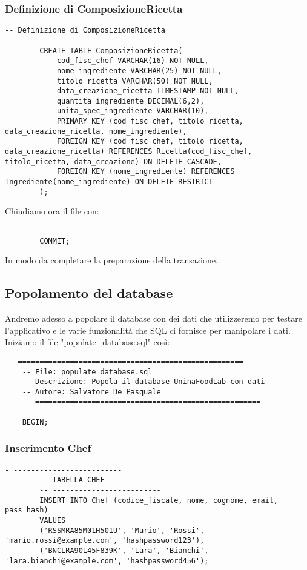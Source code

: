 \documentclass[a4paper, 12pt]{article}
\begin{document}
        \subsubsection{Definizione di ComposizioneRicetta}
        \begin{lstlisting}[style=sqlstyle]
        -- Definizione di ComposizioneRicetta
        
        CREATE TABLE ComposizioneRicetta(
            cod_fisc_chef VARCHAR(16) NOT NULL,
            nome_ingrediente VARCHAR(25) NOT NULL,
            titolo_ricetta VARCHAR(50) NOT NULL,
            data_creazione_ricetta TIMESTAMP NOT NULL,
            quantita_ingrediente DECIMAL(6,2),
            unita_spec_ingrediente VARCHAR(10),
            PRIMARY KEY (cod_fisc_chef, titolo_ricetta, data_creazione_ricetta, nome_ingrediente),
            FOREIGN KEY (cod_fisc_chef, titolo_ricetta, data_creazione_ricetta) REFERENCES Ricetta(cod_fisc_chef, titolo_ricetta, data_creazione) ON DELETE CASCADE,
            FOREIGN KEY (nome_ingrediente) REFERENCES Ingrediente(nome_ingrediente) ON DELETE RESTRICT
        );
        \end{lstlisting}
        Chiudiamo ora il file con:
        \begin{lstlisting}[style=sqlstyle]
        
        COMMIT;
        \end{lstlisting}
        In modo da completare la preparazione della transazione.

    \subsection{Popolamento del database}
    Andremo adesso a popolare il database con dei dati che utilizzeremo per testare l'applicativo e le varie funzionalità che SQL ci fornisce per manipolare i dati.\\[0.2cm]
    Iniziamo il file "populate\_database.sql" così:
    \begin{lstlisting}[style=sqlstyle]
    -- ====================================================
    -- File: populate_database.sql
    -- Descrizione: Popola il database UninaFoodLab con dati
    -- Autore: Salvatore De Pasquale
    -- ====================================================
    
    BEGIN;
    \end{lstlisting}
    \newpage
        \subsubsection{Inserimento Chef}
        \begin{lstlisting}[style=sqlstyle]
        - -------------------------
        -- TABELLA CHEF
        -- -------------------------
        INSERT INTO Chef (codice_fiscale, nome, cognome, email, pass_hash)
        VALUES 
        ('RSSMRA85M01H501U', 'Mario', 'Rossi', 'mario.rossi@example.com', 'hashpassword123'),
        ('BNCLRA90L45F839K', 'Lara', 'Bianchi', 'lara.bianchi@example.com', 'hashpassword456');
        \end{lstlisting}
\end{document}
